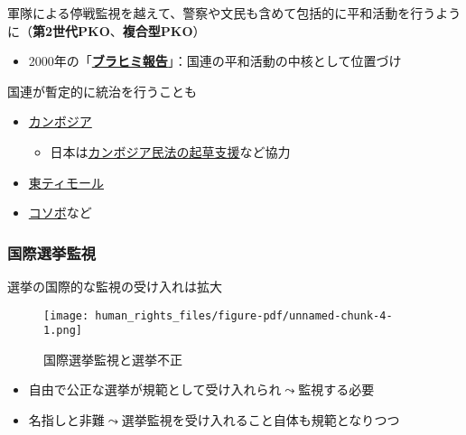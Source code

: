 \documentclass[
  xelatex,
  ja=standard]{bxjsarticle}
\providecommand{\tightlist}{%
  \setlength{\itemsep}{0pt}\setlength{\parskip}{0pt}}\usepackage{longtable,booktabs,array}
\begin{document}
軍隊による停戦監視を越えて、警察や文民も含めて包括的に平和活動を行うように（\textbf{第2世代PKO}、\textbf{複合型PKO}）

\begin{itemize}
\tightlist
\item
  2000年の「\href{https://www.unic.or.jp/files/a_55_305.pdf}{\textbf{ブラヒミ報告}}」：国連の平和活動の中核として位置づけ
\end{itemize}

国連が暫定的に統治を行うことも

\begin{itemize}
\tightlist
\item
  \href{https://www.unic.or.jp/activities/peace_security/action_for_peace/asia_pacific/cambodia/}{カンボジア}

  \begin{itemize}
  \tightlist
  \item
    日本は\href{http://www.moj.go.jp/housouken/houso_houkoku_cambo.html}{カンボジア民法の起草支援}など協力
  \end{itemize}
\item
  \href{https://www.unic.or.jp/activities/peace_security/independence/declaration/east_timor/}{東ティモール}
\item
  \href{https://www.unic.or.jp/activities/peace_security/action_for_peace/europe/kosovo/}{コソボ}など
\end{itemize}

\hypertarget{ux56fdux969bux9078ux6319ux76e3ux8996}{%
\subsubsection{国際選挙監視}\label{ux56fdux969bux9078ux6319ux76e3ux8996}}

選挙の国際的な監視の受け入れは拡大

\begin{figure}[htpb]

{\centering \texttt{[image: human\_rights\_files/figure-pdf/unnamed-chunk-4-1.png]}

}

\caption{国際選挙監視と選挙不正}

\end{figure}

\begin{itemize}
\tightlist
\item
  自由で公正な選挙が規範として受け入れられ\(\leadsto\)監視する必要
\item
  名指しと非難\(\leadsto\)選挙監視を受け入れること自体も規範となりつつ\citep{hyde2011}
\end{itemize}
\end{document}
